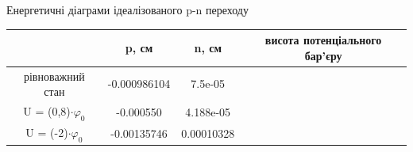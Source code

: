 \documentclass[14pt,a4paper]{scrartcl}
\begin{document}
Енергетичні діаграми ідеалізованого p-n переходу\\

\begin{tabular}{ | c | c | c | c | }
\hline
			      		& p, см 		 & n, см  		&  висота потенціального бар'єру \\ \hline
рівноважний стан 		& -0.000986104 & 7.5e-05  	&\\
U = (0,8)$\cdot\varphi_0$ & -0.000550 	 & 4.188e-05 	& \\
U = (-2)$\cdot\varphi_0$   & -0.00135746 	 & 0.00010328  & \\
\hline
\end{tabular}
\end{document}
